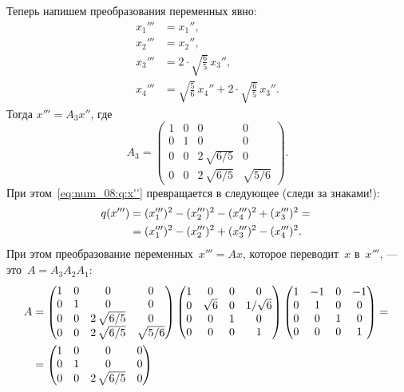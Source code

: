 \begin{solution}
	Теперь напишем преобразования переменных явно:
	\begin{align*}
		x_1''' &= x_1'',
		\\
		x_2''' &= x_2'',
		\\
		x_3''' &= 2 \cdot \sqrt{\frac{6}{5}}\,x_3'',
		\\
		x_4''' &=
			\sqrt{\frac{5}{6}}\,x_4''
			+
			2 \cdot 
			\sqrt{\frac{6}{5}}
			\,
			x_3''
			.
	\end{align*}
	Тогда $x''' = A_3 x''$, где
	\[
		A_3 =
		\begin{pmatrix}
			1 & 0 & 0 & 0 \\
			0 & 1 & 0 & 0 \\
			0 & 0 & 2\,\sqrt{6/5} & 0
			\\
			0 & 0 & 2\,\sqrt{6/5} & \sqrt{5/6}
		\end{pmatrix}
		.
	\]
	При этом~\eqref{eq:num_08:q:x''} превращается в следующее (следи за знаками!):
	\begin{align*}
		q(x''') &=
		(x_1''')^2 -
		(x_2''')^2 -
		(x_4''')^2 +
		(x_3''')^2
		= {} \\ {} &=
		(x_1''')^2 -
		(x_2''')^2 +
		(x_3''')^2 -
		(x_4''')^2
		.
	\end{align*}
	При этом преобразование переменных~$x''' = Ax$, которое переводит~$x$ в~$x'''$, --- это~$A = A_3 A_2 A_1$:
	\begin{align*}
		A &=
		\begin{pmatrix}
			1 & 0 & 0 & 0 \\
			0 & 1 & 0 & 0 \\
			0 & 0 & 2\,\sqrt{6/5} & 0
			\\
			0 & 0 & 2\,\sqrt{6/5} & \sqrt{5/6}
		\end{pmatrix}
		\begin{pmatrix}
			1 & 0 & 0 & 0
			\\
			0 & \sqrt{6} & 0 & 1/\sqrt{6}
			\\
			0 & 0 & 1 & 0
			\\
			0 & 0 & 0 & 1
		\end{pmatrix}
		\begin{pmatrix}
			1 & -1 & 0 & -1
			\\
			0 & 1 & 0 & 0
			\\
			0 & 0 & 1 & 0
			\\
			0 & 0 & 0 & 1
		\end{pmatrix}
		= {} \\ {} &=
		\begin{pmatrix}
			1 & 0 & 0 & 0 \\
			0 & 1 & 0 & 0 \\
			0 & 0 & 2\,\sqrt{6/5} & 0

\end{pmatrix}
\end{align*}
\end{solution}
